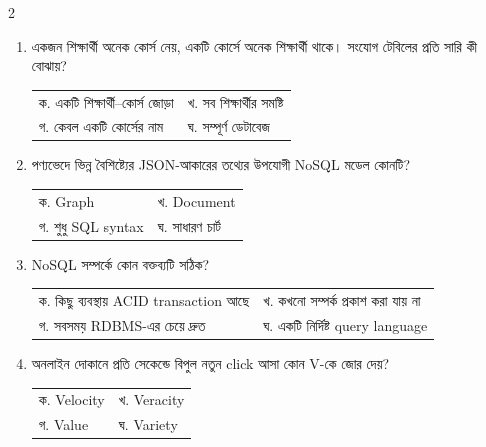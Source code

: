 \begin{multicols}{2}
\begin{enumerate}[resume]
\vspace{1pt}
\item \begin{minipage}[t]{\linewidth}
একজন শিক্ষার্থী অনেক কোর্স নেয়, একটি কোর্সে অনেক শিক্ষার্থী থাকে। সংযোগ টেবিলের প্রতি সারি কী বোঝায়?
\par
\begin{tabularx}{\linewidth}{@{}X X@{}}
ক. একটি শিক্ষার্থী–কোর্স জোড়া & খ. সব শিক্ষার্থীর সমষ্টি \\
গ. কেবল একটি কোর্সের নাম & ঘ. সম্পূর্ণ ডেটাবেজ \\
\end{tabularx}
\end{minipage}
\vspace{1pt}
\item \begin{minipage}[t]{\linewidth}
পণ্যভেদে ভিন্ন বৈশিষ্ট্যের JSON-আকারের তথ্যের উপযোগী NoSQL মডেল কোনটি?
\par\begin{tabularx}{\linewidth}{@{}X X@{}}
ক. Graph & খ. Document \\
গ. শুধু SQL syntax & ঘ. সাধারণ চার্ট \\
\end{tabularx}
\end{minipage}
\vspace{1pt}
\item \begin{minipage}[t]{\linewidth}
NoSQL সম্পর্কে কোন বক্তব্যটি সঠিক?
\par\begin{tabularx}{\linewidth}{@{}X X@{}}
ক. কিছু ব্যবস্থায় ACID transaction আছে & খ. কখনো সম্পর্ক প্রকাশ করা যায় না \\
গ. সবসময় RDBMS-এর চেয়ে দ্রুত & ঘ. একটি নির্দিষ্ট query language \\
\end{tabularx}
\end{minipage}
\vspace{1pt}
\item \begin{minipage}[t]{\linewidth}
অনলাইন দোকানে প্রতি সেকেন্ডে বিপুল নতুন click আসা কোন V-কে জোর দেয়?
\par\begin{tabularx}{\linewidth}{@{}X X@{}}
ক. Velocity & খ. Veracity \\
গ. Value & ঘ. Variety \\
\end{tabularx}
\end{minipage}
\vspace{1pt}

\end{enumerate}
\end{multicols}
